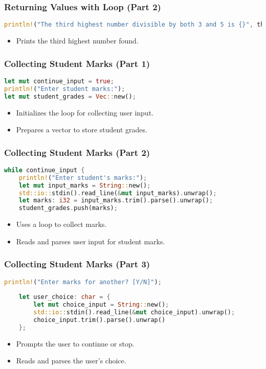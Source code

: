 \documentclass[aspectratio=169, table]{beamer}
\begin{document}
\begin{frame}[fragile]
\frametitle{Returning Values with Loop (Part 2)}
\begin{lstlisting}[language=Rust]
println!("The third highest number divisible by both 3 and 5 is {}", third_highest);
\end{lstlisting}
\begin{itemize}
\item Prints the third highest number found.
\end{itemize}
\end{frame}


\begin{frame}[fragile]
\frametitle{Collecting Student Marks (Part 1)}
\begin{lstlisting}[language=Rust]
let mut continue_input = true;
println!("Enter student marks:");
let mut student_grades = Vec::new(); 
\end{lstlisting}
\begin{itemize}
\item Initializes the loop for collecting user input.
\item Prepares a vector to store student grades.
\end{itemize}
\end{frame}

\begin{frame}[fragile]
\frametitle{Collecting Student Marks (Part 2)}
\begin{lstlisting}[language=Rust]
while continue_input {
	println!("Enter student's marks:");
	let mut input_marks = String::new();                                       
	std::io::stdin().read_line(&mut input_marks).unwrap();
	let marks: i32 = input_marks.trim().parse().unwrap(); 
	student_grades.push(marks); 
\end{lstlisting}
\begin{itemize}
\item Uses a loop to collect marks.
\item Reads and parses user input for student marks.
\end{itemize}
\end{frame}

\begin{frame}[fragile]
\frametitle{Collecting Student Marks (Part 3)}
\begin{lstlisting}[language=Rust]
	println!("Enter marks for another? [Y/N]"); 
	
	let user_choice: char = {
		let mut choice_input = String::new();                                
		std::io::stdin().read_line(&mut choice_input).unwrap();
		choice_input.trim().parse().unwrap()
	};
\end{lstlisting}
\begin{itemize}
\item Prompts the user to continue or stop.
\item Reads and parses the user's choice.
\end{itemize}
\end{frame}
\end{document}
